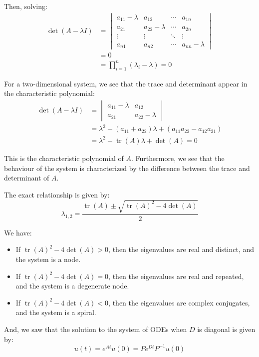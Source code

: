 Then, solving:
\begin{align*}
\det(A - \lambda I) &=
\begin{vmatrix}
a_{11} - \lambda & a_{12} & \cdots & a_{1n} \\
a_{21} & a_{22} - \lambda & \cdots & a_{2n} \\
\vdots & \vdots & \ddots & \vdots \\
a_{n1} & a_{n2} & \cdots & a_{nn} - \lambda
\end{vmatrix} \\
&= 0 \\
&= \prod_{i=1}^n (\lambda_i - \lambda) = 0
\end{align*}

For a two-dimensional system, we see that the trace and determinant appear in the characteristic polynomial:
\begin{align*}
\det(A - \lambda I) &= \begin{vmatrix}
a_{11} - \lambda & a_{12} \\
a_{21} & a_{22} - \lambda
\end{vmatrix} \\
&= \lambda^2 - (a_{11} + a_{22}) \lambda + (a_{11} a_{22} - a_{12} a_{21}) \\
&= \lambda^2 - \operatorname{tr}(A) \lambda + \det(A) = 0
\end{align*}

This is the characteristic polynomial of $A$. Furthermore, we see that the behaviour of the system is characterized by the difference between the trace and determinant of $A$.

The exact relationship is given by:
\begin{equation*}
\lambda_{1, 2} = \frac{\operatorname{tr}(A) \pm \sqrt{\operatorname{tr}(A)^2 - 4 \det(A)}}{2}
\end{equation*}

We have:
\begin{itemize}
\item If $\operatorname{tr}(A)^2 - 4 \det(A) > 0$, then the eigenvalues are real and distinct, and the system is a node.
\item If $\operatorname{tr}(A)^2 - 4 \det(A) = 0$, then the eigenvalues are real and repeated, and the system is a degenerate node.
\item If $\operatorname{tr}(A)^2 - 4 \det(A) < 0$, then the eigenvalues are complex conjugates, and the system is a spiral.
\end{itemize}

And, we saw that the solution to the system of ODEs when $D$ is diagonal is given by:
\begin{equation*}
u(t) = e^{At} u(0) = P e^{Dt} P^{-1} u(0)
\end{equation*}

